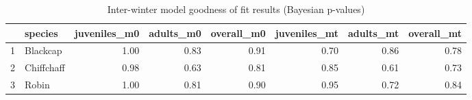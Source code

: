 \begin{table}[ht]
\centering
\begin{tabular}{rlrrrrrr}
  \hline
 & species & juveniles\_m0 & adults\_m0 & overall\_m0 & juveniles\_mt & adults\_mt & overall\_mt \\ 
  \hline
1 & Blackcap & 1.00 & 0.83 & 0.91 & 0.70 & 0.86 & 0.78 \\ 
  2 & Chiffchaff & 0.98 & 0.63 & 0.81 & 0.85 & 0.61 & 0.73 \\ 
  3 & Robin & 1.00 & 0.81 & 0.90 & 0.95 & 0.72 & 0.84 \\ 
   \hline
\end{tabular}
\caption{Inter-winter model goodness of fit results (Bayesian p-values)} 
\label{tab:gof_results_inter}
\end{table}
